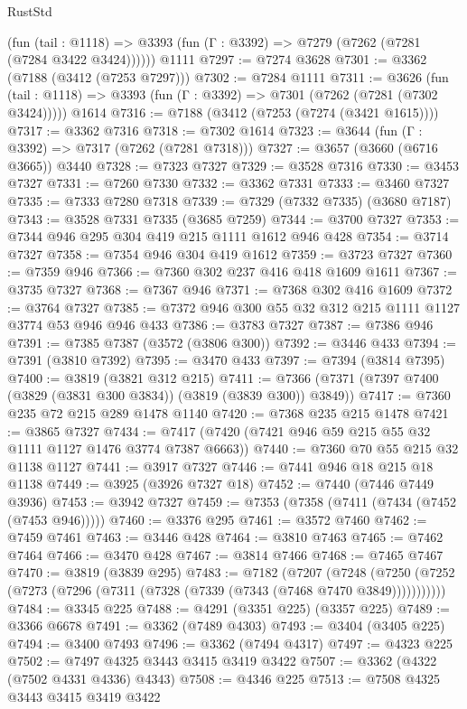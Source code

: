 \begin{lexlean}{RustStd}
\begin{coremodule}
      (fun (tail : @1118) => @3393 (fun (Γ : @3392) => @7279 (@7262 (@7281 (@7284 @3422 @3424))))))
    @1111
@7297 := @7274 @3628
@7301 := @3362 (@7188 (@3412 (@7253 @7297)))
@7302 := @7284 @1111
@7311 := @3626
    (fun (tail : @1118) => @3393 (fun (Γ : @3392) => @7301 (@7262 (@7281 (@7302 @3424)))))
    @1614
@7316 := @7188 (@3412 (@7253 (@7274 (@3421 @1615))))
@7317 := @3362 @7316
@7318 := @7302 @1614
@7323 := @3644 (fun (Γ : @3392) => @7317 (@7262 (@7281 @7318)))
@7327 := @3657 (@3660 (@6716 @3665)) @3440
@7328 := @7323 @7327
@7329 := @3528 @7316
@7330 := @3453 @7327
@7331 := @7260 @7330
@7332 := @3362 @7331
@7333 := @3460 @7327
@7335 := @7333 @7280 @7318
@7339 := @7329 (@7332 @7335) (@3680 @7187)
@7343 := @3528 @7331 @7335 (@3685 @7259)
@7344 := @3700 @7327
@7353 := @7344 @946 @295 @304 @419 @215 @1111 @1612 @946 @428
@7354 := @3714 @7327
@7358 := @7354 @946 @304 @419 @1612
@7359 := @3723 @7327
@7360 := @7359 @946
@7366 := @7360 @302 @237 @416 @418 @1609 @1611
@7367 := @3735 @7327
@7368 := @7367 @946
@7371 := @7368 @302 @416 @1609
@7372 := @3764 @7327
@7385 := @7372 @946 @300 @55 @32 @312 @215 @1111 @1127 @3774 @53 @946 @946 @433
@7386 := @3783 @7327
@7387 := @7386 @946
@7391 := @7385 @7387 (@3572 (@3806 @300))
@7392 := @3446 @433
@7394 := @7391 (@3810 @7392)
@7395 := @3470 @433
@7397 := @7394 (@3814 @7395)
@7400 := @3819 (@3821 @312 @215)
@7411 := @7366 (@7371 (@7397 @7400 (@3829 (@3831 @300 @3834)) (@3819 (@3839 @300)) @3849))
@7417 := @7360 @235 @72 @215 @289 @1478 @1140
@7420 := @7368 @235 @215 @1478
@7421 := @3865 @7327
@7434 := @7417 (@7420 (@7421 @946 @59 @215 @55 @32 @1111 @1127 @1476 @3774 @7387 @6663))
@7440 := @7360 @70 @55 @215 @32 @1138 @1127
@7441 := @3917 @7327
@7446 := @7441 @946 @18 @215 @18 @1138
@7449 := @3925 (@3926 @7327 @18)
@7452 := @7440 (@7446 @7449 @3936)
@7453 := @3942 @7327
@7459 := @7353 (@7358 (@7411 (@7434 (@7452 (@7453 @946)))))
@7460 := @3376 @295
@7461 := @3572 @7460
@7462 := @7459 @7461
@7463 := @3446 @428
@7464 := @3810 @7463
@7465 := @7462 @7464
@7466 := @3470 @428
@7467 := @3814 @7466
@7468 := @7465 @7467
@7470 := @3819 (@3839 @295)
@7483 := @7182
    (@7207
      (@7248 (@7250 (@7252 (@7273 (@7296 (@7311 (@7328 (@7339 (@7343 (@7468 @7470 @3849)))))))))))
@7484 := @3345 @225
@7488 := @4291 (@3351 @225) (@3357 @225)
@7489 := @3366 @6678
@7491 := @3362 (@7489 @4303)
@7493 := @3404 (@3405 @225)
@7494 := @3400 @7493
@7496 := @3362 (@7494 @4317)
@7497 := @4323 @225
@7502 := @7497 @4325 @3443 @3415 @3419 @3422
@7507 := @3362 (@4322 (@7502 @4331 @4336) @4343)
@7508 := @4346 @225
@7513 := @7508 @4325 @3443 @3415 @3419 @3422

\end{coremodule}
\end{lexlean}

